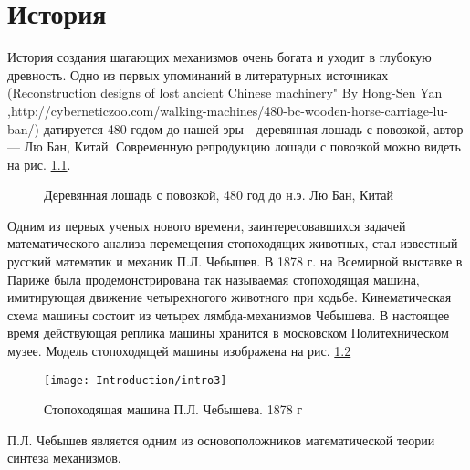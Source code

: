 \chapter{История}							%

История создания шагающих механизмов очень богата и уходит в глубокую древность. Одно из первых упоминаний в литературных источниках (Reconstruction designs of lost ancient Chinese machinery" By Hong-Sen Yan ,http://cyberneticzoo.com/walking-machines/480-bc-wooden-horse-carriage-lu-ban/) датируется 480 годом до нашей эры - деревянная лошадь с повозкой, автор --- Лю Бан, Китай. Современную репродукцию лошади с повозкой можно видеть на рис. \ref{img:wooden_horse}.

\begin{figure}[ht]
	\begin{minipage}[ht]{0.49\linewidth}
	\end{minipage}
	\hfill
	\begin{minipage}[ht]{0.49\linewidth}
	\end{minipage}
	\caption{Деревянная лошадь с повозкой, 480 год до н.э. Лю Бан, Китай}
	\label{img:wooden_horse}  
\end{figure}

Одним из первых ученых нового времени, заинтересовавшихся задачей математического анализа перемещения стопоходящих животных, стал известный русский математик и механик П.Л. Чебышев. В 1878 г. на Всемирной выставке в Париже была продемонстрирована так называемая стопоходящая машина, имитирующая движение четырехногого животного при ходьбе. Кинематическая схема машины состоит из четырех лямбда-механизмов Чебышева. В настоящее время действующая реплика машины хранится в московском Политехническом музее. Модель стопоходящей машины изображена на рис. \ref{img:chebishev}

\begin{figure}[ht]
	\centering
	\texttt{[image: Introduction/intro3]}
	\caption{Стопоходящая машина П.Л. Чебышева. 1878 г}
	\label{img:chebishev}
\end{figure}

П.Л. Чебышев является одним из основоположников математической теории синтеза механизмов.

